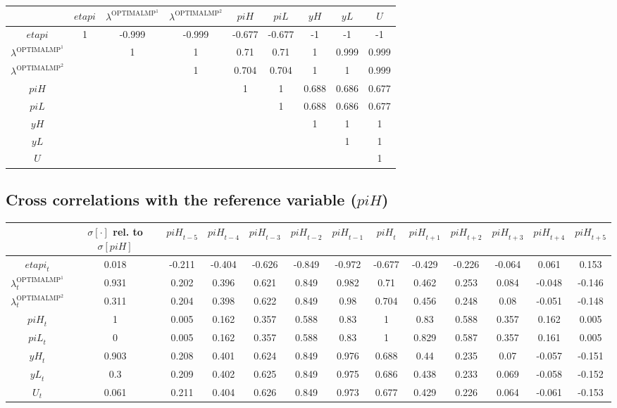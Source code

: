 \begin{tabular}{c|cccccccc|}
  & ${e\!t\!a\!p\!i}$ & $\lambda^{\mathrm{OPTIMALMP}^{\mathrm{1}}}$ & $\lambda^{\mathrm{OPTIMALMP}^{\mathrm{2}}}$ & ${p\!i\!H}$ & ${p\!i\!L}$ & ${y\!H}$ & ${y\!L}$ & $U$\\
\hline
${e\!t\!a\!p\!i}$ & 1 & -0.999 & -0.999 & -0.677 & -0.677 & -1 & -1 & -1 \\
$\lambda^{\mathrm{OPTIMALMP}^{\mathrm{1}}}$ &  & 1 & 1 & 0.71 & 0.71 & 1 & 0.999 & 0.999 \\
$\lambda^{\mathrm{OPTIMALMP}^{\mathrm{2}}}$ &  &  & 1 & 0.704 & 0.704 & 1 & 1 & 0.999 \\
${p\!i\!H}$ &  &  &  & 1 & 1 & 0.688 & 0.686 & 0.677 \\
${p\!i\!L}$ &  &  &  &  & 1 & 0.688 & 0.686 & 0.677 \\
${y\!H}$ &  &  &  &  &  & 1 & 1 & 1 \\
${y\!L}$ &  &  &  &  &  &  & 1 & 1 \\
$U$ &  &  &  &  &  &  &  & 1 \\
\hline
\end{tabular}


\subsection{Cross correlations with the reference variable (${p\!i\!H}$)}

\begin{tabular}{c|c|c|c|c|c|c|c|c|c|c|c|c|}
  & $\sigma[\cdot]$ rel. to $\sigma[{p\!i\!H}]$ & ${p\!i\!H}_{t-5}$ & ${p\!i\!H}_{t-4}$ & ${p\!i\!H}_{t-3}$ & ${p\!i\!H}_{t-2}$ & ${p\!i\!H}_{t-1}$ & ${p\!i\!H}_{t}$ & ${p\!i\!H}_{t+1}$ & ${p\!i\!H}_{t+2}$ & ${p\!i\!H}_{t+3}$ & ${p\!i\!H}_{t+4}$ & ${p\!i\!H}_{t+5}$\\
\hline
${e\!t\!a\!p\!i}_{t}$ & 0.018 & -0.211 & -0.404 & -0.626 & -0.849 & -0.972 & -0.677 & -0.429 & -0.226 & -0.064 & 0.061 & 0.153 \\
$\lambda^{\mathrm{OPTIMALMP}^{\mathrm{1}}}_{t}$ & 0.931 & 0.202 & 0.396 & 0.621 & 0.849 & 0.982 & 0.71 & 0.462 & 0.253 & 0.084 & -0.048 & -0.146 \\
$\lambda^{\mathrm{OPTIMALMP}^{\mathrm{2}}}_{t}$ & 0.311 & 0.204 & 0.398 & 0.622 & 0.849 & 0.98 & 0.704 & 0.456 & 0.248 & 0.08 & -0.051 & -0.148 \\
${p\!i\!H}_{t}$ & 1 & 0.005 & 0.162 & 0.357 & 0.588 & 0.83 & 1 & 0.83 & 0.588 & 0.357 & 0.162 & 0.005 \\
${p\!i\!L}_{t}$ & 0 & 0.005 & 0.162 & 0.357 & 0.588 & 0.83 & 1 & 0.829 & 0.587 & 0.357 & 0.161 & 0.005 \\
${y\!H}_{t}$ & 0.903 & 0.208 & 0.401 & 0.624 & 0.849 & 0.976 & 0.688 & 0.44 & 0.235 & 0.07 & -0.057 & -0.151 \\
${y\!L}_{t}$ & 0.3 & 0.209 & 0.402 & 0.625 & 0.849 & 0.975 & 0.686 & 0.438 & 0.233 & 0.069 & -0.058 & -0.152 \\
$U_{t}$ & 0.061 & 0.211 & 0.404 & 0.626 & 0.849 & 0.973 & 0.677 & 0.429 & 0.226 & 0.064 & -0.061 & -0.153 \\
\hline
\end{tabular}


